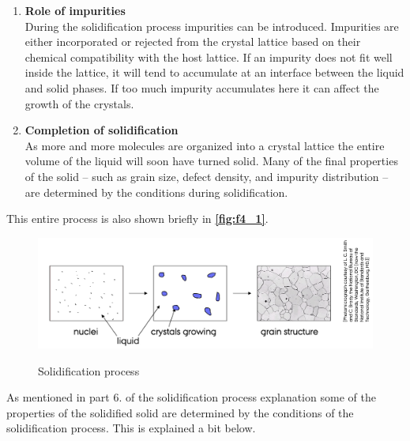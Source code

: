 \begin{enumerate}
  \item \textbf{Role of impurities} \\
    During the solidification process impurities can be introduced. Impurities are either incorporated or rejected from the crystal lattice based on their chemical compatibility with the host lattice. If an impurity does not fit well inside the lattice, it will tend to accumulate at an interface between the liquid and solid phases. If too much impurity accumulates here it can affect the growth of the crystals.
  \item \textbf{Completion of solidification} \\
    As more and more molecules are organized into a crystal lattice the entire volume of the liquid will soon have turned solid. Many of the final properties of the solid -- such as grain size, defect density, and impurity distribution -- are determined by the conditions during solidification. 
\end{enumerate}
This entire process is also shown briefly in \textbf{\autoref{fig:f4_1}}.
\begin{figure} [ht]
  \centering
  \caption{Solidification process}
  \includegraphics[width=0.75\linewidth]{./figures/f4_1.png}
  \label{fig:f4_1}
\end{figure}
As mentioned in part 6. of the solidification process explanation some of the properties of the solidified solid are determined by the conditions of the solidification process. This is explained a bit below.
